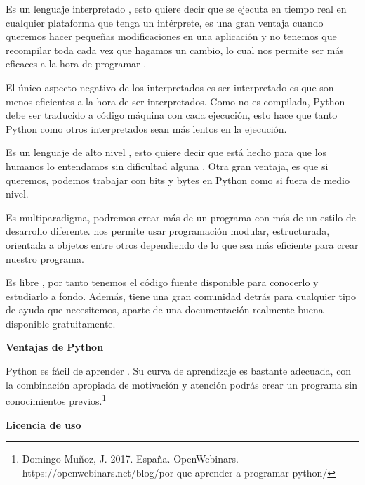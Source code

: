 \documentclass[12pt]{report}%
\begin{document}
Es un lenguaje interpretado , esto quiere decir que se ejecuta en tiempo real en cualquier plataforma que tenga un intérprete, es una gran ventaja cuando queremos hacer pequeñas modificaciones en una aplicación y no tenemos que recompilar toda cada vez que hagamos un cambio, lo cual nos permite ser más eficaces a la hora de programar .

El único aspecto negativo de los interpretados es ser interpretado es que son menos eficientes a la hora de ser interpretados. Como no es compilada, Python debe ser traducido a código máquina con cada ejecución, esto hace que tanto Python como otros interpretados sean más lentos en la ejecución.

Es un lenguaje de alto nivel , esto quiere decir que está hecho para que los humanos lo entendamos sin dificultad alguna . Otra gran ventaja, es que si queremos, podemos trabajar con bits y bytes en Python como si fuera de medio nivel.

Es multiparadigma, podremos crear más de un programa con más de un estilo de desarrollo diferente. nos permite usar programación modular, estructurada, orientada a objetos entre otros dependiendo de lo que sea más eficiente para crear nuestro programa.

Es libre , por tanto tenemos el código fuente disponible para conocerlo y estudiarlo a fondo. Además, tiene una gran comunidad detrás para cualquier tipo de ayuda que necesitemos, aparte de una documentación realmente buena disponible gratuitamente.

   \textbf{Ventajas de Python}
   
Python es fácil de aprender . Su curva de aprendizaje es bastante adecuada, con la combinación apropiada de motivación y atención podrás crear un programa sin conocimientos previos.\footnote{Domingo Muñoz, J. 2017. España. OpenWebinars. https://openwebinars.net/blog/por-que-aprender-a-programar-python/}

   \textbf{Licencia de uso}
   
\end{document}
